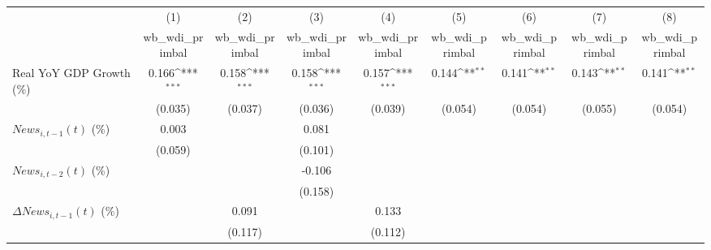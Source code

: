 {
\def\sym#1{\ifmmode^{#1}\else\(^{#1}\)\fi}
\begin{tabular}{l*{8}{c}}
\toprule
                    &\multicolumn{1}{c}{(1)}&\multicolumn{1}{c}{(2)}&\multicolumn{1}{c}{(3)}&\multicolumn{1}{c}{(4)}&\multicolumn{1}{c}{(5)}&\multicolumn{1}{c}{(6)}&\multicolumn{1}{c}{(7)}&\multicolumn{1}{c}{(8)}\\
                    &\multicolumn{1}{c}{wb_wdi_primbal}&\multicolumn{1}{c}{wb_wdi_primbal}&\multicolumn{1}{c}{wb_wdi_primbal}&\multicolumn{1}{c}{wb_wdi_primbal}&\multicolumn{1}{c}{wb_wdi_primbal}&\multicolumn{1}{c}{wb_wdi_primbal}&\multicolumn{1}{c}{wb_wdi_primbal}&\multicolumn{1}{c}{wb_wdi_primbal}\\
\midrule
Real YoY GDP Growth (\%)&       0.166\sym{***}&       0.158\sym{***}&       0.158\sym{***}&       0.157\sym{***}&       0.144\sym{**} &       0.141\sym{**} &       0.143\sym{**} &       0.141\sym{**} \\
                    &     (0.035)         &     (0.037)         &     (0.036)         &     (0.039)         &     (0.054)         &     (0.054)         &     (0.055)         &     (0.054)         \\
\addlinespace
$ News_{i,t-1}(t)$ (\%)&       0.003         &                     &       0.081         &                     &                     &                     &                     &                     \\
                    &     (0.059)         &                     &     (0.101)         &                     &                     &                     &                     &                     \\
\addlinespace
$ News_{i,t-2}(t)$ (\%)&                     &                     &      -0.106         &                     &                     &                     &                     &                     \\
                    &                     &                     &     (0.158)         &                     &                     &                     &                     &                     \\
\addlinespace
$ \Delta News_{i,t-1}(t)$ (\%)&                     &       0.091         &                     &       0.133         &                     &                     &                     &                     \\
                    &                     &     (0.117)         &                     &     (0.112)         &                     &                     &                     &                     \\

\end{tabular}}
